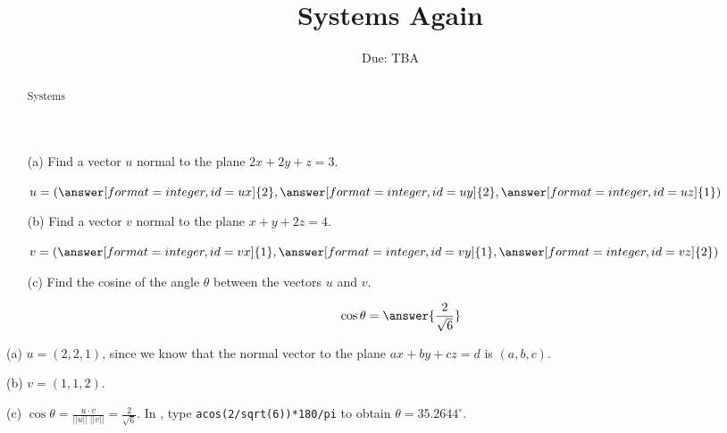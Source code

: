 \documentclass{ximera}
\title{Systems Again}
\author{\phantom{Dr. Golubitsky}}
\date{Due: TBA}
\begin{document}
\begin{abstract}
Systems  
\end{abstract}
\maketitle


\problemlabel

\begin{exercise} \label{c2.2.9}
\begin{itemize}
\item[(a)] Find a vector $u$ normal to the plane $2x+2y+z=3$.
  \begin{prompt}
    \begin{validator}[(ux==uy) && (uy==2*uz) && (uy != 0)]
      \(
        u = \left( \answer[format=integer,id=ux]{2}, \answer[format=integer,id=uy]{2}, \answer[format=integer,id=uz]{1} \right)
      \)
    \end{validator}
  \end{prompt}
\item[(b)] Find a vector $v$ normal to the plane $x+y+2z=4$.
  \begin{prompt}
    \begin{validator}[(vx==vy) && (2*vy==vz) && (vy != 0)]
      \(
        v = \left( \answer[format=integer,id=vx]{1}, \answer[format=integer,id=vy]{1}, \answer[format=integer,id=vz]{2} \right)
      \)
    \end{validator}
  \end{prompt}
\item[(c)] Find the cosine of the angle $\theta$ between the vectors $u$ and $v$.
  \begin{prompt}
    \[
      \cos \theta = \answer{\frac{2}{\sqrt{6}}}
    \]
  \end{prompt}
\end{itemize}

\begin{solution}

(a) $u = (2,2,1)$, since we know that the normal vector to the plane
$ax + by + cz = d$ is $(a,b,c)$.

(b) $v = (1,1,2)$.

(c) $\cos\theta = \frac{u \cdot v}{||u||\;||v||} = \frac{2}{\sqrt{6}}$.
In \Matlabp, type {\tt acos(2/sqrt(6))*180/pi} to obtain $\theta =
35.2644^\circ$.

\end{solution}
\end{exercise}
\end{document}
